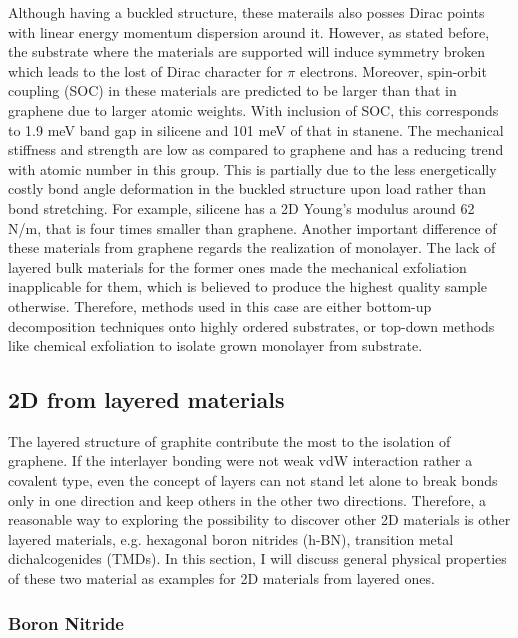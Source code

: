Although having a buckled structure, these materails also posses Dirac points with linear energy momentum dispersion around it\cite{Garcia2011}.  However, as stated before, the substrate where the materials are supported will induce symmetry broken which leads to the lost of Dirac character for $\pi$ electrons\cite{Lin2013}. Moreover, spin-orbit coupling (SOC) in these materials are predicted to be larger than that in graphene due to larger atomic weights. With inclusion of SOC, this corresponds to 1.9 meV band gap in silicene  and 101 meV of that in stanene\cite{matthes2013}. The mechanical stiffness and strength are low as compared to graphene and has a reducing trend with atomic number in this group. This is partially due to the less energetically costly bond angle deformation in the buckled structure upon load rather than bond stretching\cite{Manjanath2014}. For example, silicene has a 2D Young's modulus around 62 \si{N/m}, that is four times smaller than graphene. Another important difference of these materials from graphene regards the realization of monolayer. The lack of layered bulk materials for the former ones made the mechanical exfoliation inapplicable for them, which is believed to produce the highest quality sample otherwise. Therefore, methods used in this case are either bottom-up decomposition techniques onto highly ordered substrates\cite{vogt2012,li2014}, or top-down methods like chemical exfoliation to isolate grown monolayer from substrate\cite{lin2012,kaloni2013}.


\subsection{2D from layered materials}

The layered structure of graphite contribute the most to the isolation of graphene. If the interlayer bonding were not weak vdW interaction rather a covalent type, even the concept of layers can not stand let alone to break bonds only in one direction and keep others in the other two directions. Therefore, a reasonable way to exploring the possibility to discover other 2D materials is other layered materials, e.g. hexagonal boron nitrides (h-BN), transition metal dichalcogenides (TMDs). In this section, I will discuss general physical properties of these two material as examples for 2D materials from layered ones.

\subsubsection{Boron Nitride}


